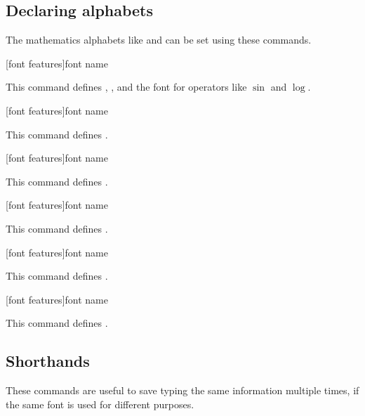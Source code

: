 \documentclass{ltxdockit}
\begin{document}
\subsection{Declaring alphabets}

The mathematics alphabets like  and  can be set using these commands.

\begin{ltxsyntax}

[font features]{font name}

This command defines , ,  and the font for operators like $\sin$ and $\log$.

[font features]{font name}

This command defines .

[font features]{font name}

This command defines .

[font features]{font name}

This command defines .

[font features]{font name}

This command defines .

[font features]{font name}

This command defines .

\end{ltxsyntax}

\subsection{Shorthands}

These commands are useful to save typing the same information multiple times, if the same font is used for different purposes.
\end{document}
